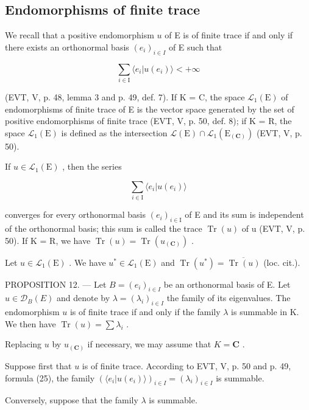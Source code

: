 \subsection{Endomorphisms of finite trace}

We recall that a positive endomorphism \(u\) of E is of finite trace if and only if there exists an orthonormal basis \((e_i)_{i \in I}\) of E such that

\[
\sum_ {i \in \mathrm{I}} \langle e _ {i} | u (e _ {i}) \rangle <   + \infty
\]

(EVT, V, p. 48, lemma 3 and p. 49, def. 7). If K = C, the space \(\mathcal{L}_1(\mathrm{E})\) of endomorphisms of finite trace of E is the vector space generated by the set of positive endomorphisms of finite trace (EVT, V, p. 50, def. 8); if K = R, the space \(\mathcal{L}_1(\mathrm{E})\) is defined as the intersection \(\mathcal{L}(\mathrm{E}) \cap \mathcal{L}_1(\mathrm{E}_{(\mathbf{C})})\) (EVT, V, p. 50).

If \(u\in \mathcal{L}_1(\mathrm{E})\) , then the series

\[
\sum_ {i \in \mathrm{I}} \langle e _ {i} | u (e _ {i}) \rangle
\]

converges for every orthonormal basis \((e_{i})_{i\in\mathrm{I}}\) of E and its sum is independent of the orthonormal basis; this sum is called the trace \(\operatorname{Tr}(u)\) of u (EVT, V, p. 50). If K = R, we have \(\operatorname{Tr}(u) = \operatorname{Tr}(u_{(\mathbf{C})})\) .

Let \(u \in \mathcal{L}_1(\mathrm{E})\) . We have \(u^* \in \mathcal{L}_1(\mathrm{E})\) and \(\operatorname{Tr}(u^*) = \overline{\operatorname{Tr}(u)}\) (loc. cit.).

PROPOSITION 12. --- Let \(B = (e_i)_{i \in I}\) be an orthonormal basis of E. Let \(u \in \mathcal{D}_B(E)\) and denote by \(\lambda = (\lambda_i)_{i \in I}\) the family of its eigenvalues. The endomorphism \(u\) is of finite trace if and only if the family \(\lambda\) is summable in K. We then have \(\operatorname{Tr}(u) = \sum \lambda_i\) .

Replacing \(u\) by \(u_{(\mathbf{C})}\) if necessary, we may assume that \(K = \mathbf{C}\) .

Suppose first that \(u\) is of finite trace. According to EVT, V, p. 50 and p. 49, formula (25), the family \((\langle e_i | u(e_i) \rangle)_{i \in I} = (\lambda_i)_{i \in I}\) is summable.

Conversely, suppose that the family \(\lambda\) is summable.

